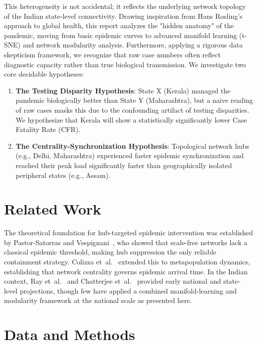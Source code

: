 \documentclass[sigconf]{acmart}
\begin{document}
This heterogeneity is not accidental; it reflects the underlying network topology of the Indian state-level connectivity. Drawing inspiration from Hans Rosling's approach to global health, this report analyzes the "hidden anatomy" of the pandemic, moving from basic epidemic curves to advanced manifold learning (t-SNE) and network modularity analysis. Furthermore, applying a rigorous data skepticism framework, we recognize that raw case numbers often reflect diagnostic capacity rather than true biological transmission. We investigate two core decidable hypotheses:

\begin{enumerate}
  \item \textbf{The Testing Disparity Hypothesis}: State X (Kerala) managed the pandemic biologically better than State Y (Maharashtra), but a naive reading of raw cases masks this due to the confounding artifact of testing disparities. We hypothesize that Kerala will show a statistically significantly lower Case Fatality Rate (CFR).
  \item \textbf{The Centrality-Synchronization Hypothesis}: Topological network hubs (e.g., Delhi, Maharashtra) experienced faster epidemic synchronization and reached their peak load significantly faster than geographically isolated peripheral states (e.g., Assam).
\end{enumerate}

\section{Related Work}
\label{sec:related}
The theoretical foundation for hub-targeted epidemic intervention was established by Pastor-Satorras and Vespignani~\cite{pastorsatorras2001}, who showed that scale-free networks lack a classical epidemic threshold, making hub suppression the only reliable containment strategy. Colizza et~al.~\cite{colizza2007} extended this to metapopulation dynamics, establishing that network centrality governs epidemic arrival time. In the Indian context, Ray et~al.~\cite{ray2020} and Chatterjee et~al.~\cite{chatterjee2020} provided early national and state-level projections, though few have applied a combined manifold-learning and modularity framework at the national scale as presented here.

\section{Data and Methods}
\label{sec:methods}
\end{document}
